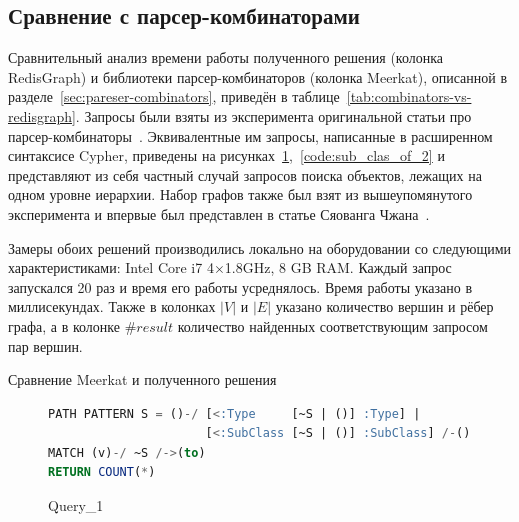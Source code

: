 \subsection{Сравнение с парсер-комбинаторами}\label{sec:parse-comp-compare}
Сравнительный анализ времени работы полученного решения (колонка RedisGraph) и библиотеки парсер-комбинаторов (колонка Meer\-kat), описанной в разделе~\ref{sec:pareser-combinators}, приведён в таблице~\ref{tab:combinators-vs-redisgraph}. Запросы были взяты из эксперимента оригинальной статьи про парсер-комбинаторы~\cite{parser-combinators}. Эквивалентные им запросы, написанные в расширенном синтаксисе Cyp\-her, приведены на рисунках~\ref{code:sub_clas_of_1},~\ref{code:sub_clas_of_2} и представляют из себя частный случай запросов поиска объектов, лежащих на одном уровне иерархии. Набор графов также был взят из вышеупомянутого эксперимента и впервые был представлен в статье Сяованга Чжана~\cite{zhlang-2016}.


Замеры обоих решений производились локально на оборудовании со следующими характеристиками: Intel Core i7 4$\times$1.8GHz, 8 GB RAM. Каждый запрос запускался 20 раз и время его работы усреднялось. Время работы указано в миллисекундах. Также в колонках $|V|$ и $|E|$ указано количество вершин и рёбер графа, а в колонке $\#result$ количество найденных соответствующим запросом пар вершин. 

\begin{table}[h!]
\begin{adjustbox}{max width=\textwidth}

\end{adjustbox}
\caption{Сравнение Meerkat и полученного решения}
\label{tab:combinators-vs-redisgraph}
\end{table}

\begin{figure}[h!]
\begin{adjustbox}{max width=\textwidth}
\begin{lstlisting}[language=sql]
PATH PATTERN S = ()-/ [<:Type     [~S | ()] :Type] | 
                      [<:SubClass [~S | ()] :SubClass] /-()
MATCH (v)-/ ~S /->(to)
RETURN COUNT(*)
\end{lstlisting}
\end{adjustbox}
\caption{Query\_1}
\label{code:sub_clas_of_1}
\end{figure}

